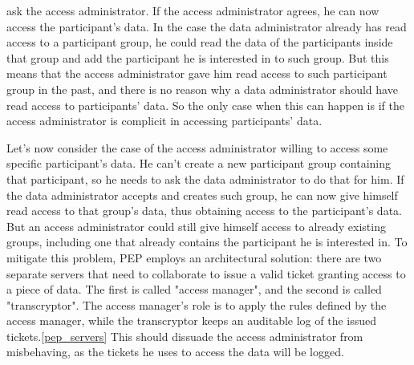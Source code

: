 \documentclass{report}
\begin{document}
ask the access administrator. If the access administrator agrees, he can now access the participant's data. In the case the data administrator already has read access to a participant 
group, he could read the data of the participants inside that group and add the participant he is interested in to such group. But this means that the access administrator gave him 
read access to such participant group in the past, and there is no reason why a data administrator should have read access to participants' data. So the only case when this can happen 
is if the access administrator is complicit in accessing participants' data. \par
Let's now consider the case of the access administrator willing to access some specific participant's data. 
He can't create a new participant group containing that participant, so he needs to ask the data administrator to do that for him. If the data administrator accepts and creates such 
group, he can now give himself read access to that group's data, thus obtaining access to the participant's data. But an access administrator could still give himself access to already 
existing groups, including one that already contains the participant he is interested in. To mitigate this problem, PEP employs an architectural solution: there are two separate
servers that need to collaborate to issue a valid ticket granting access to a piece of data. The first is called "access manager", and the second is called "transcryptor". The access manager's role is to apply the rules defined by the access manager, while the transcryptor keeps an auditable log of the issued
tickets.\ref{pep_servers} This should dissuade the access administrator from misbehaving, as the tickets he uses to access the data will be logged.
\end{document}

